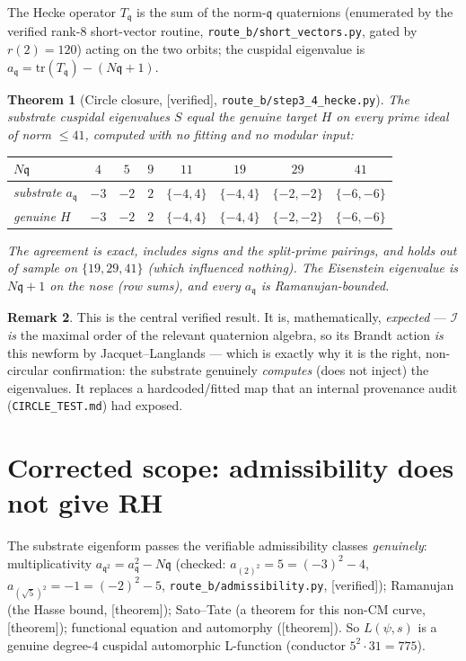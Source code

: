 \documentclass[11pt,a4paper]{article}
\newtheorem{theorem}{Theorem}[section]
\theoremstyle{definition}
\newtheorem{remark}[theorem]{Remark}
\newcommand{\TAGthm}{{\small\textsf{[\textcolor{green!45!black}{theorem}]}}}
\newcommand{\TAGver}{{\small\textsf{[\textcolor{blue!60!black}{verified}]}}}
\begin{document}
The Hecke operator $T_\mathfrak{q}$ is the sum of the norm-$\mathfrak{q}$
quaternions (enumerated by the verified rank-$8$ short-vector routine,
\texttt{route\_b/short\_vectors.py}, gated by $r(2)=120$) acting on the two
orbits; the cuspidal eigenvalue is $a_\mathfrak{q}=\mathrm{tr}(T_\mathfrak{q})-(N\mathfrak{q}+1)$.

\begin{theorem}[Circle closure, \TAGver, \texttt{route\_b/step3\_4\_hecke.py}]
\label{thm:circle}
The substrate cuspidal eigenvalues $S$ equal the genuine target $H$ on every
prime ideal of norm $\le41$, computed with \emph{no fitting} and \emph{no
modular input}:
\begin{center}
\begin{tabular}{lccccccc}
\toprule
$N\mathfrak{q}$ & $4$ & $5$ & $9$ & $11$ & $19$ & $29$ & $41$\\
\midrule
substrate $a_\mathfrak{q}$ & $-3$ & $-2$ & $2$ & $\{-4,4\}$ & $\{-4,4\}$ & $\{-2,-2\}$ & $\{-6,-6\}$\\
genuine $H$ & $-3$ & $-2$ & $2$ & $\{-4,4\}$ & $\{-4,4\}$ & $\{-2,-2\}$ & $\{-6,-6\}$\\
\bottomrule
\end{tabular}
\end{center}
The agreement is exact, includes signs and the split-prime pairings, and
holds \emph{out of sample} on $\{19,29,41\}$ (which influenced nothing). The
Eisenstein eigenvalue is $N\mathfrak{q}+1$ on the nose (row sums), and every
$a_\mathfrak{q}$ is Ramanujan-bounded.
\end{theorem}

\begin{remark}
This is the central verified result. It is, mathematically, \emph{expected}
--- $\mathcal{I}$ \emph{is} the maximal order of the relevant quaternion
algebra, so its Brandt action \emph{is} this newform by Jacquet--Langlands ---
which is exactly why it is the right, non-circular confirmation: the
substrate genuinely \emph{computes} (does not inject) the eigenvalues. It
replaces a hardcoded/fitted map that an internal provenance audit
(\texttt{CIRCLE\_TEST.md}) had exposed.
\end{remark}

\section{Corrected scope: admissibility does not give RH}\label{sec:correct}

The substrate eigenform passes the verifiable admissibility classes
\emph{genuinely}: multiplicativity $a_{\mathfrak{q}^2}=a_\mathfrak{q}^2-N\mathfrak{q}$
(checked: $a_{(2)^2}=5=(-3)^2-4$, $a_{(\sqrt5)^2}=-1=(-2)^2-5$,
\texttt{route\_b/admissibility.py}, \TAGver); Ramanujan (the Hasse bound,
\TAGthm); Sato--Tate (a theorem for this non-CM curve, \TAGthm); functional
equation and automorphy (\TAGthm). So $L(\psi,s)$ is a genuine degree-$4$
cuspidal automorphic L-function (conductor $5^2\cdot31=775$).
\end{document}
